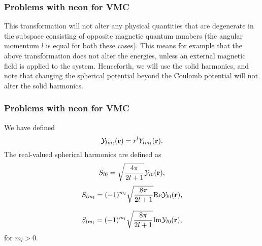 \frame
{
  \frametitle{Problems with neon for VMC}
\begin{small}
{\scriptsize
This transformation will not alter any physical quantities that are
degenerate in the subspace consisting of opposite magnetic quantum
numbers (the angular momentum $l$ is equal for both these cases). This
means for example that the above transformation does not alter the
energies, unless an external magnetic field is applied to the
system. Henceforth, we will use the solid harmonics, and note that
changing the spherical potential beyond the Coulomb potential will not
alter the solid harmonics.
}
\end{small}
}



\frame
{
  \frametitle{Problems with neon for VMC}
\begin{small}
{\scriptsize
We have defined 
\begin{equation*}
  {\cal Y}_{lm_l}(\mathbf{r}) = r^l Y_{lm_l}(\mathbf{r}).
\end{equation*}
The real-valued spherical harmonics are defined as
\[
S_{l0} =  \sqrt{\frac{4\pi}{2l+1}} {\cal Y}_{l0}(\mathbf{r}),
\]
\[
S_{lm_l} =  (-1)^{m_l}\sqrt{\frac{8\pi}{2l+1}} \mathrm{Re}{\cal Y}_{l0}(\mathbf{r}),
\]

\[
S_{lm_l} =  (-1)^{m_l}\sqrt{\frac{8\pi}{2l+1}} \mathrm{Im}{\cal Y}_{l0}(\mathbf{r}),
\]
for $m_l> 0$.

}
\end{small}
}





